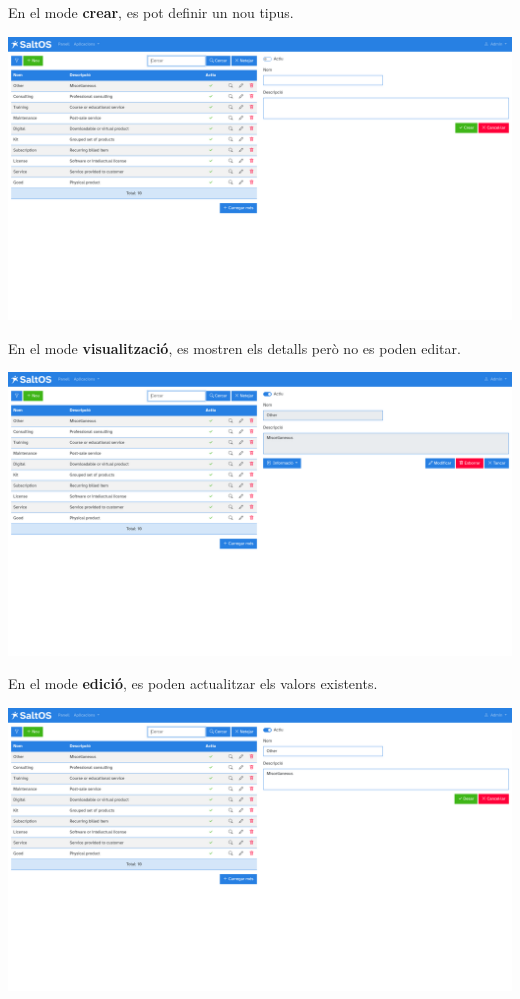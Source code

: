 \documentclass[a4paper]{article}
\begin{document}
En el mode \textbf{crear}, es pot definir un nou tipus.

\begin{center}\includegraphics[width=1\textwidth]{../ujest/snaps/test-screenshots-js-screenshots-sales-products-types-create-ca-es-1-snap.png}\end{center}

En el mode \textbf{visualització}, es mostren els detalls però no es poden editar.

\begin{center}\includegraphics[width=1\textwidth]{../ujest/snaps/test-screenshots-js-screenshots-sales-products-types-view-10-ca-es-1-snap.png}\end{center}

En el mode \textbf{edició}, es poden actualitzar els valors existents.

\begin{center}\includegraphics[width=1\textwidth]{../ujest/snaps/test-screenshots-js-screenshots-sales-products-types-edit-10-ca-es-1-snap.png}\end{center}
\end{document}
